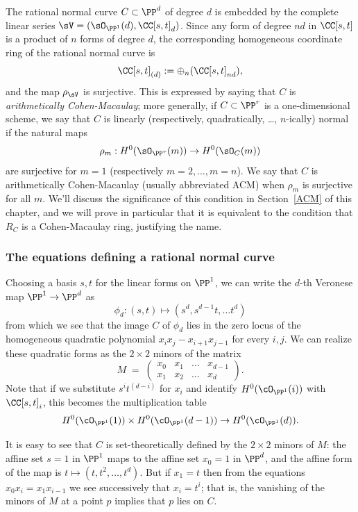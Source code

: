 The rational normal curve $C\subset \PP^d$ of degree $d$ is embedded by the complete linear series
$\sV = (\sO_{\PP^1}(d), \CC[s,t]_d)$. Since any form of degree $nd$ in $\CC[s,t]$ is a product of $n$ forms of degree $d$, 
the corresponding homogeneous coordinate ring of the rational normal curve is 
$$
\CC[s,t]_{(d)} := \oplus_n(\CC[s,t]_{nd}),
$$
and the map $\rho_{\sV}$ is surjective. This is expressed by saying
that $C$ is \emph{arithmetically Cohen-Macaulay}; more generally, if $C\subset \PP^r$ is 
a one-dimensional scheme, we say that $C$ is linearly (respectively, quadratically, \dots, $n$-ically) normal
if  the natural maps
$$
\rho_m: H^0(\sO_{\PP^r}(m)) \to H^0(\sO_{C}(m))
$$
are surjective for  $m=1$ (respectively $m=2,\dots, m=n$). We say that $C$ is arithmetically Cohen-Macaulay
(usually abbreviated ACM)
 when $\rho_m$ is surjective for all $m$. We'll discuss the significance of this condition in Section~\ref{ACM} of this chapter, and we will prove in particular that it is equivalent to the condition that $R_{C}$ is a Cohen-Macaulay ring, justifying
 the name.



\subsubsection{The equations defining a rational normal curve}

Choosing a basis $s,t$ for the linear forms on $\PP^1$, we can write the $d$-th Veronese map $\PP^{1}\to \PP^{d}$ as
$$
\phi_d : (s,t) \mapsto (s^d, s^{d-1}t,\dots t^d)
$$
from which we see that the image $C$ of $\phi_d$ lies in the zero locus of the homogeneous quadratic polynomial $x_i x_j - x_{i+1}x_{j-1}$ for every $i,j$. We can realize these quadratic forms as the $2\times 2$ minors of the matrix
$$
M \; = \; \begin{pmatrix}
x_0 & x_1 & \dots & x_{d-1} \\
x_1 & x_2 & \dots & x_d
\end{pmatrix}.
$$
Note that if we substitute $s^it^{(d-i)}$ for $x_i$ and identify $H^0(\cO_{\PP^1}(i))$ with $\CC[s,t]_i$, this becomes the multiplication table
$$
H^0(\cO_{\PP^1}(1)) \times H^0(\cO_{\PP^1}(d-1)) \to H^0(\cO_{\PP^1}(d)).
$$


It is easy to see that $C$ is set-theoretically defined by the $2\times 2$ minors of $M$: the affine set $s=1$ in $\PP^1$ maps
to the affine set $x_0 = 1$ in $\PP^d$, and the affine form of the map is $t \mapsto (t, t^2, \dots, t^d)$. But if $x_1 = t$ then from 
the equations $x_0x_i = x_1x_{i-1}$ we see successively that $x_i = t^i$; that is, the vanishing of the minors of $M$ at a point $p$
implies that $p$ lies on $C$.

